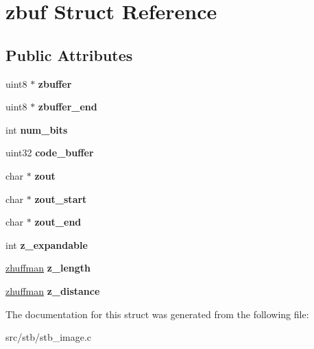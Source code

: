 \hypertarget{structzbuf}{}\section{zbuf Struct Reference}
\label{structzbuf}
\subsection*{Public Attributes}
\begin{DoxyCompactItemize}
\item 
\mbox{\label{structzbuf_a7080eb91dcc67e1dfe818d08e6f22c4e}} 
uint8 $\ast$ {\bfseries zbuffer}
\item 
\mbox{\label{structzbuf_af030baa17bebedd18272678da17a33f4}} 
uint8 $\ast$ {\bfseries zbuffer\+\_\+end}
\item 
\mbox{\label{structzbuf_acd069cdb4100884a732ad2794edbbdff}} 
int {\bfseries num\+\_\+bits}
\item 
\mbox{\label{structzbuf_a3bb8244d7be17801079c5a8587182edb}} 
uint32 {\bfseries code\+\_\+buffer}
\item 
\mbox{\label{structzbuf_aaf137c25fa5b9fb14e92354da4203c38}} 
char $\ast$ {\bfseries zout}
\item 
\mbox{\label{structzbuf_af31571e8d74c78c9bb18d92205150b28}} 
char $\ast$ {\bfseries zout\+\_\+start}
\item 
\mbox{\label{structzbuf_af07c0b7b7227f670ee1413bc0dcab791}} 
char $\ast$ {\bfseries zout\+\_\+end}
\item 
\mbox{\label{structzbuf_ae662f24e0973ca19b543e64647a6bfb6}} 
int {\bfseries z\+\_\+expandable}
\item 
\mbox{\label{structzbuf_a5906bdbe9dfb565339acac51af9efe89}} 
\hyperlink{structzhuffman}{zhuffman} {\bfseries z\+\_\+length}
\item 
\mbox{\label{structzbuf_ae7d9588b2548708e14f3c6ad89bf26b5}} 
\hyperlink{structzhuffman}{zhuffman} {\bfseries z\+\_\+distance}
\end{DoxyCompactItemize}


The documentation for this struct was generated from the following file\+:\begin{DoxyCompactItemize}
\item 
src/stb/stb\+\_\+image.\+c\end{DoxyCompactItemize}

